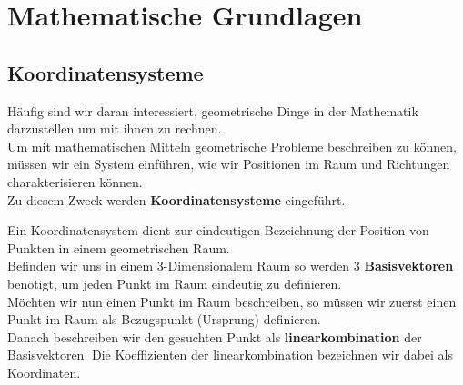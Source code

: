 
\section{Mathematische Grundlagen}
\label{chap:Style}

\subsection{Koordinatensysteme}

Häufig sind wir daran interessiert, geometrische Dinge in der Mathematik darzustellen um mit ihnen zu rechnen. \\
Um mit mathematischen Mitteln geometrische Probleme beschreiben zu können, müssen wir ein System einführen, wie wir
Positionen im Raum und Richtungen charakterisieren können. \\
Zu diesem Zweck werden \textbf{Koordinatensysteme} eingeführt.

\beginip
Ein Koordinatensystem dient zur eindeutigen Bezeichnung der Position von Punkten in einem geometrischen Raum.  \\
Befinden wir uns in einem 3-Dimensionalem Raum so werden 3 \textbf{Basisvektoren} benötigt, um jeden Punkt im Raum eindeutig zu definieren. \\
Möchten wir nun einen Punkt im Raum beschreiben, so müssen wir zuerst einen Punkt im Raum als Bezugspunkt (Ursprung) definieren. \\
Danach beschreiben wir den gesuchten Punkt als \textbf{linearkombination} der Basisvektoren. Die Koeffizienten der linearkombination bezeichnen wir dabei als Koordinaten.
\iend

